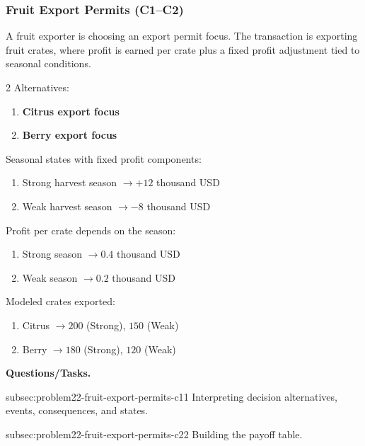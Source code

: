 	\subsubsection{Fruit Export Permits (C1--C2)}
	\label{sec:problem22-fruit-export-permits-c1-c2}
	A fruit exporter is choosing an export permit focus. The transaction is exporting fruit crates, where profit is earned per crate plus a fixed profit adjustment tied to seasonal conditions.

	\begin{multicols}{2}
		Alternatives:
		\begin{enumerate}[label=\arabic*.]
			\item \textbf{Citrus export focus}
			\item \textbf{Berry export focus}
		\end{enumerate}

		Seasonal states with fixed profit components:
		\begin{enumerate}[label=\arabic*.]
			\item Strong harvest season $\to +12$ thousand USD
			\item Weak harvest season $\to -8$ thousand USD
		\end{enumerate}

			\columnbreak

		Profit per crate depends on the season:
		\begin{enumerate}[label=\arabic*.]
			\item Strong season $\to 0.4$ thousand USD
			\item Weak season $\to 0.2$ thousand USD
		\end{enumerate}

		Modeled crates exported:
		\begin{enumerate}[label=\arabic*.]
			\item Citrus $\to 200$ (Strong), $150$ (Weak)
			\item Berry $\to 180$ (Strong), $120$ (Weak)
		\end{enumerate}
	\end{multicols}

	\textbf{Questions/Tasks.}
	\begin{enumerate}
		\CriterionTask
		{subsec:problem22-fruit-export-permits-c1}{1}
		{Interpreting decision alternatives, events, consequences, and states.}

		\CriterionTask
		{subsec:problem22-fruit-export-permits-c2}{2}
		{Building the payoff table.}
	\end{enumerate}

